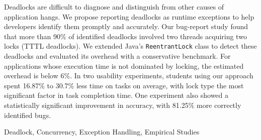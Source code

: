 Deadlocks are difficult to diagnose and distinguish from other causes of application hangs.
We propose reporting deadlocks as runtime exceptions to help developers identify them promptly and accurately.
Our bug-report study found that more than 90\% of identified deadlocks involved two threads acquiring two locks (TTTL deadlocks).
We extended Java's {\tt ReentrantLock} class to detect these deadlocks and evaluated its overhead with a conservative benchmark.
For applications whose execution time is not dominated by locking, the estimated overhead is below 6\%.
In two usability experiments, students using our approach spent 16.87\% to 30.7\% less time on tasks on average, with lock type the most significant factor in task completion time.
One experiment also showed a statistically significant improvement in accuracy, with 81.25\% more correctly identified bugs.

\begin{keywords}
Deadlock, Concurrency, Exception Handling, Empirical Studies
\end{keywords}